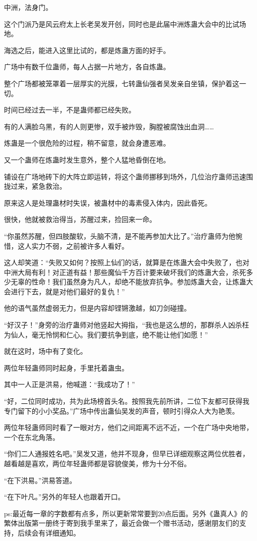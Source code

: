 \begin{this_body}
中洲，法身门。

这个门派乃是风云府太上长老吴发开创，同时也是此届中洲炼蛊大会中的比试场地。

海选之后，能进入这里比试的，都是炼蛊方面的好手。

广场中有数千位蛊师，每人占据一片地方，各自炼蛊。

整个广场都被笼罩着一层厚实的光膜，七转蛊仙强者吴发亲自坐镇，保护着这一切。

时间已经过去一半，不是蛊师都已经失败。

有的人满脸乌黑，有的人则更惨，双手被炸毁，胸膛被腐蚀出血洞……

炼蛊是一个很危险的过程，稍不留意，就会身遭恶难。

又一个蛊师在炼蛊时发生意外，整个人猛地昏倒在地。

铺设在广场地砖下的大阵立即运转，将这个蛊师挪移到场外，几位治疗蛊师迅速围拢过来，紧急救治。

原来这人是处理蛊材时失误，被蛊材中的毒素侵入体内，因此昏死。

很快，他就被救治得当，苏醒过来，捡回来一命。

“你虽然苏醒，但四肢酸软，头脑不清，是不能再参加大比了。”治疗蛊师为他惋惜，这人实力不弱，之前被许多人看好。

这人却笑道：“失败又如何？按照上仙们的话，就算是在炼蛊大会中失败了，也对中洲大局有利！对正道有益！那些魔仙千方百计要来破坏我们的炼蛊大会，杀死多少无辜的性命！我们虽然身为凡人，却绝不能放弃抗争。参加炼蛊大会，让炼蛊大会进行下去，就是对他们最好的复仇！”

他的语气虽然虚弱无力，但是内容却铿锵激越，如刀剑碰撞。

“好汉子！”身旁的治疗蛊师对他竖起大拇指，“我也是这么想的，那群杀人凶杀枉为仙人，毫无怜悯和仁心。我们要抗争到底，绝不能让他们如愿！”

就在这时，场中有了变化。

两位年轻蛊师同时起身，手里托着蛊虫。

其中一人正是洪易，他喊道：“我成功了！”

“好，二位同时成功，共为此场榜首头名。按照我先前所讲，二位下友都可获得我专门留下的小小奖品。”广场中传出蛊仙吴发的声音，顿时引得众人大为艳羡。

两位年轻蛊师同时看了一眼对方，他们之间距离不远不近，一个在广场中央地带，一个在东北角落。

“你们二人通报姓名吧。”吴发又道，他并不现身，但早已详细观察这两位优胜者，越看越是喜欢，两位年轻蛊师都是容貌俊美，修为十分不俗。

“在下洪易。”洪易答道。

“在下叶凡。”另外的年轻人也跟着开口。

ps:最近每一章的字数都有点多，所以更新常常要到20点后面。另外《蛊真人》的繁体出版第一册终于寄到我手里来了，最近会做一个赠书活动，感谢朋友们的支持，后续会有详细通知。

\end{this_body}


